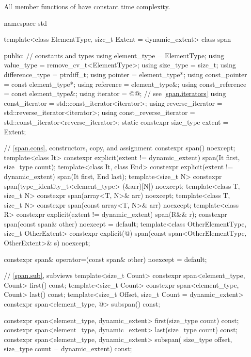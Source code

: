 \pnum
All member functions of  have constant time complexity.

%
\begin{codeblock}
namespace std {
  template<class ElementType, size_t Extent = dynamic_extent>
  class span {
  public:
    // constants and types
    using element_type = ElementType;
    using value_type = remove_cv_t<ElementType>;
    using size_type = size_t;
    using difference_type = ptrdiff_t;
    using pointer = element_type*;
    using const_pointer = const element_type*;
    using reference = element_type&;
    using const_reference = const element_type&;
    using iterator = @@;        // see \ref{span.iterators}
    using const_iterator = std::const_iterator<iterator>;
    using reverse_iterator = std::reverse_iterator<iterator>;
    using const_reverse_iterator = std::const_iterator<reverse_iterator>;
    static constexpr size_type extent = Extent;

    // \ref{span.cons}, constructors, copy, and assignment
    constexpr span() noexcept;
    template<class It>
      constexpr explicit(extent != dynamic_extent) span(It first, size_type count);
    template<class It, class End>
      constexpr explicit(extent != dynamic_extent) span(It first, End last);
    template<size_t N>
      constexpr span(type_identity_t<element_type> (&arr)[N]) noexcept;
    template<class T, size_t N>
      constexpr span(array<T, N>& arr) noexcept;
    template<class T, size_t N>
      constexpr span(const array<T, N>& arr) noexcept;
    template<class R>
      constexpr explicit(extent != dynamic_extent) span(R&& r);
    constexpr span(const span& other) noexcept = default;
    template<class OtherElementType, size_t OtherExtent>
      constexpr explicit(@\seebelow@) span(const span<OtherElementType, OtherExtent>& s) noexcept;

    constexpr span& operator=(const span& other) noexcept = default;

    // \ref{span.sub}, subviews
    template<size_t Count>
      constexpr span<element_type, Count> first() const;
    template<size_t Count>
      constexpr span<element_type, Count> last() const;
    template<size_t Offset, size_t Count = dynamic_extent>
      constexpr span<element_type, @\seebelow@> subspan() const;

    constexpr span<element_type, dynamic_extent> first(size_type count) const;
    constexpr span<element_type, dynamic_extent> last(size_type count) const;
    constexpr span<element_type, dynamic_extent> subspan(
      size_type offset, size_type count = dynamic_extent) const;

}}
\end{codeblock}
